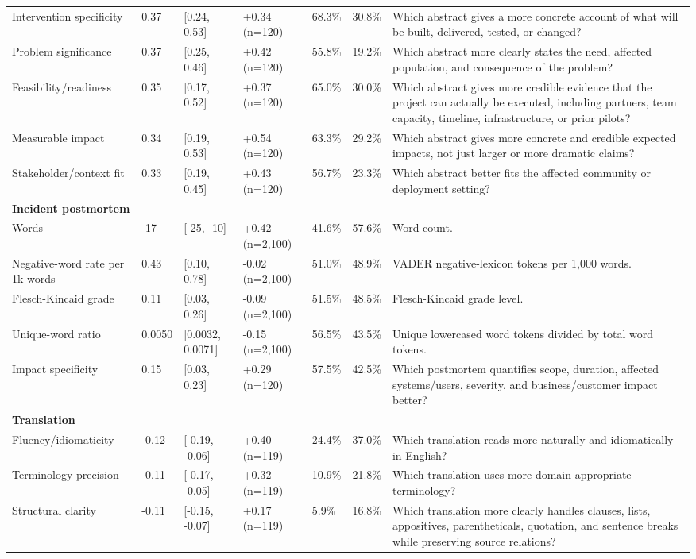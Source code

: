 \begin{longtable}{lllllll}
Intervention specificity & 0.37 & [0.24, 0.53] & +0.34 (n=120) & 68.3\% & 30.8\% & Which abstract gives a more concrete account of what will be built, delivered, tested, or changed? \\
Problem significance & 0.37 & [0.25, 0.46] & +0.42 (n=120) & 55.8\% & 19.2\% & Which abstract more clearly states the need, affected population, and consequence of the problem? \\
Feasibility/readiness & 0.35 & [0.17, 0.52] & +0.37 (n=120) & 65.0\% & 30.0\% & Which abstract gives more credible evidence that the project can actually be executed, including partners, team capacity, timeline, infrastructure, or prior pilots? \\
Measurable impact & 0.34 & [0.19, 0.53] & +0.54 (n=120) & 63.3\% & 29.2\% & Which abstract gives more concrete and credible expected impacts, not just larger or more dramatic claims? \\
Stakeholder/context fit & 0.33 & [0.19, 0.45] & +0.43 (n=120) & 56.7\% & 23.3\% & Which abstract better fits the affected community or deployment setting? \\
\multicolumn{7}{l}{\textbf{Incident postmortem}} \\
Words & -17 & [-25, -10] & +0.42 (n=2,100) & 41.6\% & 57.6\% & Word count. \\
Negative-word rate per 1k words & 0.43 & [0.10, 0.78] & -0.02 (n=2,100) & 51.0\% & 48.9\% & VADER negative-lexicon tokens per 1,000 words. \\
Flesch-Kincaid grade & 0.11 & [0.03, 0.26] & -0.09 (n=2,100) & 51.5\% & 48.5\% & Flesch-Kincaid grade level. \\
Unique-word ratio & 0.0050 & [0.0032, 0.0071] & -0.15 (n=2,100) & 56.5\% & 43.5\% & Unique lowercased word tokens divided by total word tokens. \\
Impact specificity & 0.15 & [0.03, 0.23] & +0.29 (n=120) & 57.5\% & 42.5\% & Which postmortem quantifies scope, duration, affected systems/users, severity, and business/customer impact better? \\
\multicolumn{7}{l}{\textbf{Translation}} \\
Fluency/idiomaticity & -0.12 & [-0.19, -0.06] & +0.40 (n=119) & 24.4\% & 37.0\% & Which translation reads more naturally and idiomatically in English? \\
Terminology precision & -0.11 & [-0.17, -0.05] & +0.32 (n=119) & 10.9\% & 21.8\% & Which translation uses more domain-appropriate terminology? \\
Structural clarity & -0.11 & [-0.15, -0.07] & +0.17 (n=119) & 5.9\% & 16.8\% & Which translation more clearly handles clauses, lists, appositives, parentheticals, quotation, and sentence breaks while preserving source relations? \\
\end{longtable}
